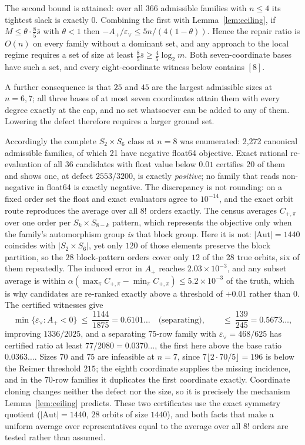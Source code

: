 \documentclass[11pt]{article}
\theoremstyle{remark}
\newcommand{\eps}{\varepsilon}
\begin{document}
The second bound is attained: over all $366$ admissible families with $n\le4$
its tightest slack is exactly $0$.  Combining the first with
Lemma~\ref{lem:ceiling}, if $M\le\theta\cdot\tfrac85\bar s$ with $\theta<1$ then
$-A_+/\eps_\vee\le5n/(4(1-\theta))$.  Hence the repair ratio is $O(n)$ on every
family without a dominant set, and any approach to the local regime requires a
set of size at least $\tfrac85\bar s\ge\tfrac45\log_2m$.  Both seven-coordinate
bases have such a set, and every eight-coordinate witness below contains $[8]$.

A further consequence is that $25$ and $45$ are the largest admissible sizes at
$n=6,7$; all three bases of at most seven coordinates attain them with every
degree exactly at the cap, and no set whatsoever can be added to any of them.
Lowering the defect therefore requires a larger ground set.

Accordingly the complete $S_2\times S_6$ class at $n=8$ was enumerated: 2,272
canonical admissible families, of which 21 have negative float64 objective.
Exact rational re-evaluation of all 36 candidates with float value below
$0.01$ certifies 20 of them and shows one, at defect $2553/3200$, is exactly
\emph{positive}; no family that reads non-negative in float64 is exactly
negative.  The discrepancy is not rounding: on a fixed order set the float and
exact evaluators agree to $10^{-14}$, and the exact orbit route reproduces the
average over all $8!$ orders exactly.  The census averages $C_{+,\pi}$ over one
order per $S_k\times S_{8-k}$ pattern, which represents the objective only when
the family's automorphism group \emph{is} that block group.  Here it is not:
$|\mathrm{Aut}|=1440$ coincides with $|S_2\times S_6|$, yet only $120$ of those
elements preserve the block partition, so the $28$ block-pattern orders cover
only $12$ of the $28$ true orbits, six of them repeatedly.  The induced error in
$A_+$ reaches $2.03\times10^{-3}$, and any subset average is within
$\alpha(\max_\pi C_{+,\pi}-\min_\pi C_{+,\pi})\le5.2\times10^{-3}$ of the truth,
which is why candidates are re-ranked exactly above a threshold of $+0.01$
rather than $0$.  The certified
witnesses give
\[
  \min\{\eps_\vee:A_+<0\}\ \le\ \frac{1144}{1875}=0.6101\ldots
  \quad\text{(separating)},\qquad \le\ \frac{139}{245}=0.5673\ldots,
\]
improving $1336/2025$, and a separating $75$-row family with $\eps_\vee=468/625$
has certified ratio at least $77/2080=0.0370\ldots$, the first here above the
base ratio $0.0363\ldots$.  Sizes $70$ and $75$ are infeasible at $n=7$, since
$7\lfloor2\cdot70/5\rfloor=196$ is below the Reimer threshold $215$; the eighth
coordinate supplies the missing incidence, and in the $70$-row families it
duplicates the first coordinate exactly.  Coordinate cloning changes neither the
defect nor the size, so it is precisely the mechanism Lemma~\ref{lem:ceiling}
predicts.  These two certificates use the exact symmetry quotient
($|\mathrm{Aut}|=1440$, $28$ orbits of size $1440$), and both facts that make a
uniform average over representatives equal to the average over all $8!$ orders
are tested rather than assumed.
\end{document}

